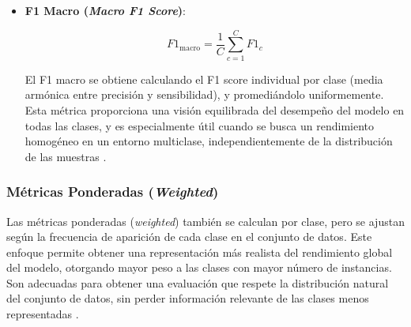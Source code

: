 \begin{itemize}
\item \textbf{F1 Macro (\textit{Macro F1 Score})}:

\begin{equation}
F1_{\text{macro}} = \frac{1}{C} \sum_{c=1}^{C} F1_c
\end{equation}

El F1 macro se obtiene calculando el F1 score individual por clase (media armónica entre precisión y sensibilidad), y promediándolo uniformemente. Esta métrica proporciona una visión equilibrada del desempeño del modelo en todas las clases, y es especialmente útil cuando se busca un rendimiento homogéneo en un entorno multiclase, independientemente de la distribución de las muestras \cite{Sokolova2006}.

\end{itemize}

\subsubsection*{Métricas Ponderadas (\textit{Weighted})}

Las métricas ponderadas (\textit{weighted}) también se calculan por clase, pero se ajustan según la frecuencia de aparición de cada clase en el conjunto de datos. Este enfoque permite obtener una representación más realista del rendimiento global del modelo, otorgando mayor peso a las clases con mayor número de instancias. Son adecuadas para obtener una evaluación que respete la distribución natural del conjunto de datos, sin perder información relevante de las clases menos representadas \cite{Chawla2003}.

